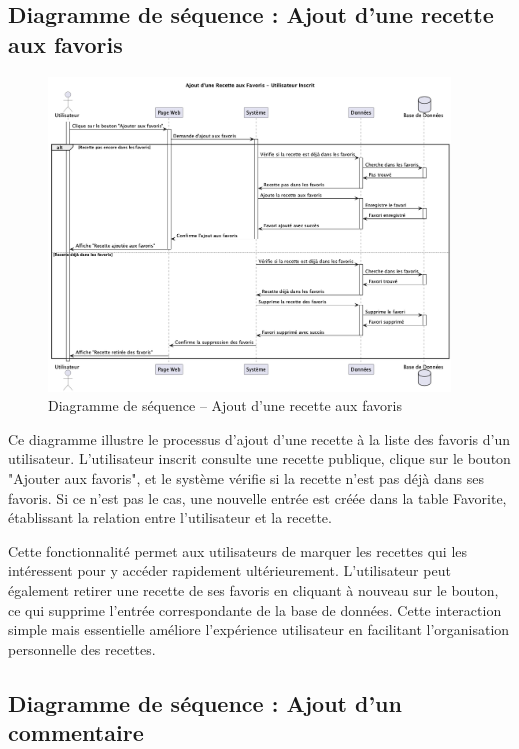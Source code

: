 \documentclass[12pt,a4paper]{report}
\begin{document}
\subsection{Diagramme de séquence : Ajout d'une recette aux favoris}

\begin{figure}[H]
    \centering
    \includegraphics[width=0.95\textwidth]{sequence_diagram_ajout_favoris.png}
    \caption{Diagramme de séquence – Ajout d'une recette aux favoris}
    \label{fig:sequence_ajout_favoris}
\end{figure}

Ce diagramme illustre le processus d'ajout d'une recette à la liste des favoris d'un utilisateur. L'utilisateur inscrit consulte une recette publique, clique sur le bouton "Ajouter aux favoris", et le système vérifie si la recette n'est pas déjà dans ses favoris. Si ce n'est pas le cas, une nouvelle entrée est créée dans la table Favorite, établissant la relation entre l'utilisateur et la recette.

Cette fonctionnalité permet aux utilisateurs de marquer les recettes qui les intéressent pour y accéder rapidement ultérieurement. L'utilisateur peut également retirer une recette de ses favoris en cliquant à nouveau sur le bouton, ce qui supprime l'entrée correspondante de la base de données. Cette interaction simple mais essentielle améliore l'expérience utilisateur en facilitant l'organisation personnelle des recettes.

\subsection{Diagramme de séquence : Ajout d'un commentaire}
\end{document}
